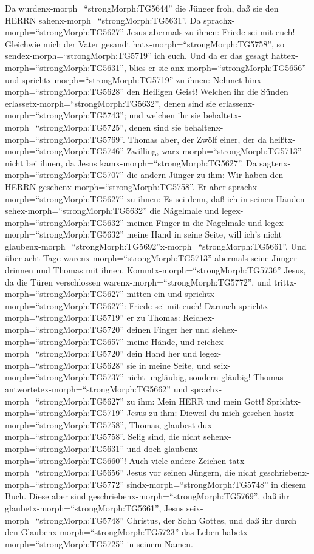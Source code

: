 Da wurdenx-morph=``strongMorph:TG5644'' die Jünger froh, daß sie den
HERRN sahenx-morph=``strongMorph:TG5631''.  Da
sprachx-morph=``strongMorph:TG5627'' Jesus abermals zu ihnen: Friede sei
mit euch! Gleichwie mich der Vater gesandt
hatx-morph=``strongMorph:TG5758'', so
sendex-morph=``strongMorph:TG5719'' ich euch.  Und da er
das gesagt hattex-morph=``strongMorph:TG5631'', blies er sie
anx-morph=``strongMorph:TG5656'' und
sprichtx-morph=``strongMorph:TG5719'' zu ihnen: Nehmet
hinx-morph=``strongMorph:TG5628'' den Heiligen Geist! 
Welchen ihr die Sünden erlassetx-morph=``strongMorph:TG5632'', denen
sind sie erlassenx-morph=``strongMorph:TG5743''; und welchen ihr sie
behaltetx-morph=``strongMorph:TG5725'', denen sind sie
behaltenx-morph=``strongMorph:TG5769''.  Thomas aber, der
Zwölf einer, der da heißtx-morph=``strongMorph:TG5746'' Zwilling,
warx-morph=``strongMorph:TG5713'' nicht bei ihnen, da Jesus
kamx-morph=``strongMorph:TG5627''.  Da
sagtenx-morph=``strongMorph:TG5707'' die andern Jünger zu ihm: Wir haben
den HERRN gesehenx-morph=``strongMorph:TG5758''. Er aber
sprachx-morph=``strongMorph:TG5627'' zu ihnen: Es sei denn, daß ich in
seinen Händen sehex-morph=``strongMorph:TG5632'' die Nägelmale und
legex-morph=``strongMorph:TG5632'' meinen Finger in die Nägelmale und
legex-morph=``strongMorph:TG5632'' meine Hand in seine Seite, will ich's
nicht
glaubenx-morph=``strongMorph:TG5692''\textbar x-morph=``strongMorph:TG5661''.
 Und über acht Tage warenx-morph=``strongMorph:TG5713''
abermals seine Jünger drinnen und Thomas mit ihnen.
Kommtx-morph=``strongMorph:TG5736'' Jesus, da die Türen verschlossen
warenx-morph=``strongMorph:TG5772'', und
trittx-morph=``strongMorph:TG5627'' mitten ein und
sprichtx-morph=``strongMorph:TG5627'': Friede sei mit euch!
 Darnach sprichtx-morph=``strongMorph:TG5719'' er zu
Thomas: Reichex-morph=``strongMorph:TG5720'' deinen Finger her und
siehex-morph=``strongMorph:TG5657'' meine Hände, und
reichex-morph=``strongMorph:TG5720'' dein Hand her und
legex-morph=``strongMorph:TG5628'' sie in meine Seite, und
seix-morph=``strongMorph:TG5737'' nicht ungläubig, sondern gläubig!
 Thomas antwortetex-morph=``strongMorph:TG5662'' und
sprachx-morph=``strongMorph:TG5627'' zu ihm: Mein HERR und mein Gott!
 Sprichtx-morph=``strongMorph:TG5719'' Jesus zu ihm:
Dieweil du mich gesehen hastx-morph=``strongMorph:TG5758'', Thomas,
glaubest dux-morph=``strongMorph:TG5758''. Selig sind, die nicht
sehenx-morph=``strongMorph:TG5631'' und doch
glaubenx-morph=``strongMorph:TG5660''!  Auch viele andere
Zeichen tatx-morph=``strongMorph:TG5656'' Jesus vor seinen Jüngern, die
nicht geschriebenx-morph=``strongMorph:TG5772''
sindx-morph=``strongMorph:TG5748'' in diesem Buch.  Diese
aber sind geschriebenx-morph=``strongMorph:TG5769'', daß ihr
glaubetx-morph=``strongMorph:TG5661'', Jesus
seix-morph=``strongMorph:TG5748'' Christus, der Sohn Gottes, und daß ihr
durch den Glaubenx-morph=``strongMorph:TG5723'' das Leben
habetx-morph=``strongMorph:TG5725'' in seinem Namen.

